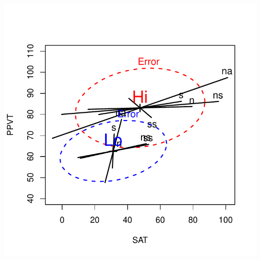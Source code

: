 \documentclass[11pt]{article}
\newcommand*{\MLMs}{MvLMs\xspace}
\newcommand{\pkg}[1]{{\textsf{#1} package}}
\newcommand{\R}{\textsf{R}\xspace}
\begin{document}
\begin{minipage}[b]{.3\linewidth}
	\includegraphics[width=\linewidth, trim=0 30 0 30]{fig/plot-rohwer-HE1}
\end{minipage}


\begin{abstract}
	This vignette provides some worked examples of the analysis of multivariate linear models 
	(\MLMs)
	with graphical methods for visualizing results using the \pkg{heplots} and the \pkg{candisc}.
	The emphasis here is on using these methods in \R, and understanding how they help reveal
	aspects of these models that might not be apparent from other graphical displays.

	No attempt is made here to describe the theory of \MLMs or the statistical details behind
	HE plots and their reduced-rank canonical cousins.
	For that, see \citet{FoxFriendlyMonette:09:compstat,Friendly:07:manova,Friendly:06:hesoft}.
\end{abstract}

{\small
 \tableofcontents
}




\end{document}

